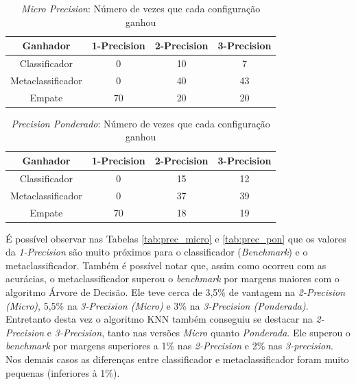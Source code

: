 \begin{table}[h!]
  \begin{center}
    \begin{tabular}{cccc}
      \hline
      \textbf{Ganhador} & \textbf{1-Precision} & \textbf{2-Precision} & \textbf{3-Precision}\\
      \hline

Classificador	&	0	&	10	&	7	\\
Metaclassificador	&	0	&	40	&	43	\\
Empate	&	70	&	20	&	20	\\

      \hline
    \end{tabular}
    \caption{\textit{Micro Precision}: Número de vezes que cada configuração ganhou}
    \label{tab:count_micro}
  \end{center}
\end{table}

\begin{table}[h!]
  \begin{center}
    \begin{tabular}{cccc}
      \hline
      \textbf{Ganhador} & \textbf{1-Precision} & \textbf{2-Precision} & \textbf{3-Precision}\\
      \hline

Classificador	&	0	&	15	&	12	\\
Metaclassificador	&	0	&	37	&	39	\\
Empate	&	70	&	18	&	19	\\

      \hline
    \end{tabular}
    \caption{\textit{Precision Ponderado}: Número de vezes que cada configuração ganhou}
    \label{tab:count_pon}
  \end{center}
\end{table}

É possível observar nas Tabelas \ref{tab:prec_micro} e \ref{tab:prec_pon} que os valores da \textit{1-Precision} são muito próximos para o classificador (\textit{Benchmark}) e o metaclassificador.
Também é possível notar que, assim como ocorreu com as acurácias, o metaclassificador superou o \textit{benchmark} por margens maiores com o algoritmo Árvore de Decisão.
Ele teve cerca de 3,5\% de vantagem na \textit{2-Precision (Micro)}, 5,5\% na \textit{3-Precision (Micro)} e 3\% na \textit{3-Precision (Ponderada)}. 
Entretanto desta vez o algoritmo KNN também conseguiu se destacar na \textit{2-Precision} e \textit{3-Precision}, tanto nas versões \textit{Micro} quanto \textit{Ponderada}. 
Ele superou o \textit{benchmark} por margens superiores a 1\% nas \textit{2-Precision} e 2\% nas \textit{3-precision}.
Nos demais casos as diferenças entre classificador e metaclassificador foram muito pequenas (inferiores à 1\%).

